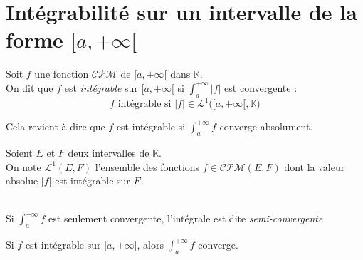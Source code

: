 \documentclass[11pt,a4paper,fleqn,pdftex]{report}
\begin{document}
\section{Intégrabilité sur un intervalle de la forme $[a,+\infty [$} %
\label{sec:integrabilite}
\begin{dfn}
    \label{dfn:integrable}
     Soit $f$ une fonction $\mathcal{CPM}$ de $[a,+\infty[$ dans $\mathbb{K}$.\\
     On dit que $f$ est \emph{intégrable} sur $[a,+\infty[$ si $\int_a^{+\infty} |f|$ est convergente : 
     \begin{equation}
     f\text{ intégrable si } |f|\in\mathcal{L}^1\bigg([a,+\infty[,\mathbb{K}\bigg)
     \end{equation}
\end{dfn}
Cela revient à dire que $f$ est intégrable si $\int_a^{+\infty} f$ converge absolument. 
\begin{dfn}
     Soient $E$ et $F$ deux intervalles de $\mathbb{K}$.\\
     On note $\mathcal{L}^1(E,F)$ l'ensemble des fonctions $f \in \mathcal{CPM}(E,F)$ dont la valeur absolue $|f|$ est intégrable sur $E$.
\end{dfn}
\\
Si $\int_a^{+\infty} f$ est seulement convergente, l'intégrale est dite \emph{semi-convergente}
\begin{theorem}
     Si $f$ est intégrable sur $[a,+\infty[$, alors $\int_a^{+\infty} f$ converge.
\end{theorem}
\end{document}
